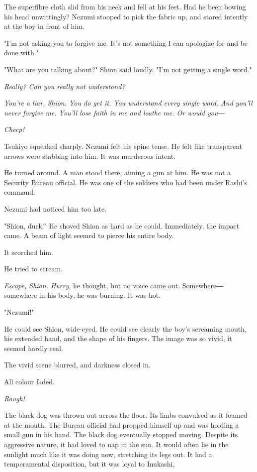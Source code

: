 The superfibre cloth slid from his neck and fell at his feet. Had he
been bowing his head unwittingly? Nezumi stooped to pick the fabric up,
and stared intently at the boy in front of him.

"I'm not asking you to forgive me. It's not something I can apologize
for and be done with."

"What are you talking about?" Shion said loudly. "I'm not getting a
single word."

\emph{Really? Can you really not understand?}

\emph{You're a liar, Shion. You do get it. You understand every single word.
And you'll never forgive me. You'll lose faith in me and loathe me. Or
would you―}

\emph{Cheep!}

Tsukiyo squeaked sharply. Nezumi felt his spine tense. He felt like
transparent arrows were stabbing into him. It was murderous intent.

He turned around. A man stood there, aiming a gun at him. He was not a
Security Bureau official. He was one of the soldiers who had been under
Rashi's command.

Nezumi had noticed him too late.

"Shion, duck!" He shoved Shion as hard as he could. Immediately, the
impact came. A beam of light seemed to pierce his entire body.

It scorched him.

He tried to scream.

\emph{Escape, Shion. Hurry}, he thought, but no voice came out. Somewhere―
somewhere in his body, he was burning. It was hot.

"Nezumi!"

He could see Shion, wide-eyed. He could see clearly the boy's screaming
mouth, his extended hand, and the shape of his fingers. The image was so
vivid, it seemed hardly real.

The vivid scene blurred, and darkness closed in.

All colour faded.

\mybreak

\emph{Raugh!}

The black dog was thrown out across the floor. Its limbs convulsed as it
foamed at the mouth. The Bureau official had propped himself up and was
holding a small gun in his hand. The black dog eventually stopped
moving. Despite its aggressive nature, it had loved to nap in the sun.
It would often lie in the sunlight much like it was doing now,
stretching its legs out. It had a temperamental disposition, but it was
loyal to Inukashi,

